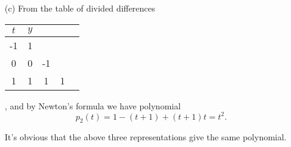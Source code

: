 \documentclass[a4paper]{book}
\makeatletter
\newenvironment{sol}[1][\solname]{\par
  \pushQED{\qed}
  \normalfont \topsep6\p@\@plus6\p@\relax
  \trivlist
  \item[\hskip\labelsep
        \itshape
    #1\@addpunct{.}]\ignorespaces
}{\popQED\endtrivlist\@endpefalse}
\providecommand{\solname}{Solution}
\numberwithin{equation}{chapter}
\theoremstyle{definition}
\makeatother
\begin{document}
\begin{sol}
\begin{itemize}
    \item[(c)]
       From the table of divided differences
  \begin{center}
  \begin{tabular}{c|cccc}
  $t$  & $y$ \\
  \hline 
  -1 & 1 \\
  0 & 0 & -1 \\
  1 & 1 & 1 & 1
  \end{tabular}
  \end{center}
  , and by Newton's formula we have polynomial
  \begin{displaymath}
    p_2(t) = 1 - (t+1) + (t+1)t = t^2.
  \end{displaymath}
  
  It's obvious that the above three representations give the same polynomial.
    \end{itemize}
  \end{sol}
    
\end{document}
